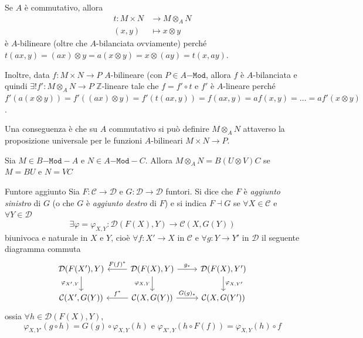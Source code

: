 \begin{remark}{}
    Se \(A\) è commutativo, allora 
    \begin{align*}
        t : M \times N &\to M \otimes_A N \\
        {(x, y)} & \mapsto x \otimes y
    \end{align*}
    è \(A\)-bilineare (oltre che \(A\)-bilanciata ovviamente) perché
    \(t {(ax, y)} = {(ax)} \otimes y = a{(x \otimes y)} = x \otimes {(ay)} =
    t{(x, ay)}\).

    Inoltre, data \(f: M \times N \to P\) \(A\)-bilineare (con \(P \in
    A\mathtt{-Mod}\), allora \(f\) è \(A\)-bilanciata e quindi \(\exists! f' :
    M \otimes_A N \to P\) \(\mathbb{Z}\)-lineare tale che \(f = f' \circ t\)  e
    \(f'\) è \(A\)-lineare perché \(f'{(a{(x \otimes y)})} = f'{({(ax)} \otimes
    y)} = f'{(t{(ax, y)})} = f{(ax, y)} = a f{(x, y)} = \dots = af'{(x \otimes
    y)}\).

    Una conseguenza è che su \(A\) commutativo si può definire \(M \otimes_A N\)
    attaverso la proposizione universale per le funzioni \(A\)-bilineari \(M
    \times N \to P\).
\end{remark}

\begin{remark}{}
    Sia \(M \in B\mathtt{-Mod-}A\) e \(N \in A\mathtt{-Mod-}C\). Allora \(M
    \otimes_A N = B {(U \otimes V)}C \) se \(M = B U \) e \(N = VC\) 
\end{remark}

\begin{definition}{Funtore aggiunto}
    Sia \(F : \mathcal{C} \to \mathcal{D}\) e \(G : \mathcal{D} \to
    \mathcal{D}\) funtori. Si dice che \(F\) è \emph{aggiunto sinistro} di
    \(G\) (o che \(G\) è \emph{aggiunto destro} di \(F\)) e si indica \(F \dashv
    G\) se \(\forall X \in \mathcal{C}\) e \(\forall Y \in \mathcal{D}\)
    \[
      \exists \varphi = \varphi_{X,Y} : \mathcal{D}{(F{(X)}, Y)} \to
      \mathcal{C}{(X, G{(Y)})}
    \]
    biunivoca e naturale in \(X\) e \(Y\), cioè \(\forall f : X' \to X\) in
    \(\mathcal{C}\) e \(\forall g : Y \to Y'\) in \(\mathcal{D}\) il seguente
    diagramma commuta
    \[\begin{tikzcd}
        \mathcal{D}{(F{(X')}, Y)} & \mathcal{D}{(F{(X)}, Y)} &
        \mathcal{D}{(F{(X)}, Y')} \\
        \mathcal{C}{(X', G{(Y)})} & \mathcal{C}{(X, G{(Y)})} & \mathcal{C}{(X,
        G{(Y')})}
        \arrow["{\varphi_{X', Y}}"', from=1-1, to=2-1]
        \arrow["{F(f)^*}"', from=1-2, to=1-1]
        \arrow["{g_*}", from=1-2, to=1-3]
        \arrow["{\varphi_{X,Y}}"', from=1-2, to=2-2]
        \arrow["{\varphi_{X, Y'}}", from=1-3, to=2-3]
        \arrow["{f^*}"', from=2-2, to=2-1]
        \arrow["{G(g)_*}", from=2-2, to=2-3]
    \end{tikzcd}\]
    ossia \(\forall h \in \mathcal{D}{(F{(X)}, Y)}\), \[\varphi_{X, Y'}  {(g \circ h)} =
    G{(g)} \circ \varphi_{X, Y}  {(h)} \text{ e } \varphi _{X',Y} {(h \circ F{(f)})}
    = \varphi _{X, Y} {(h)}
    \circ f\] 
\end{definition}

